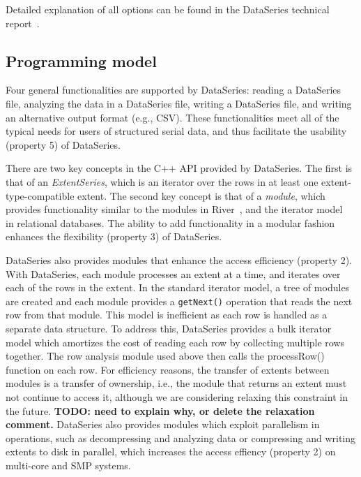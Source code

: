 \documentclass{acm_proc_article-sp}
\begin{document}
Detailed explanation of all options can be found in the DataSeries
technical report~\cite{DSTechnicalReportSnapshot}.

\subsection{Programming model}
Four general functionalities are supported by DataSeries:
reading a DataSeries file, 
analyzing the data in a DataSeries file,
writing a DataSeries file,
and writing an alternative output format (e.g., CSV).
These functionalities meet all of the typical needs for
users of structured serial data, and thus facilitate
the usability (property 5) of DataSeries.

There are two key concepts in the C++ API provided by DataSeries. The
first is that of an \textit{ExtentSeries}, which is an iterator over
the rows in at least one extent-type-compatible extent.  
The second key concept is that of a \textit{module}, which provides
functionality similar to the modules in River~\cite{river99}, and the
iterator model~\cite{graefeQueryProcessing93} in relational databases.
The ability to add functionality in a modular fashion enhances
the flexibility (property 3) of DataSeries.

DataSeries also provides modules that enhance the access efficiency
(property 2).
With DataSeries, each module processes an extent at a time, and
iterates over each of the rows in the extent.  In the standard
iterator model, a tree of modules are created and each module provides
a {\tt getNext()} operation that reads the next row from that module.
This model is inefficient as each row is handled as a separate data
structure.  To address this, DataSeries provides a 
bulk iterator model which amortizes the cost of reading each
row by collecting multiple rows together.  The row analysis module
used above then calls the processRow() function on each row.  For
efficiency reasons, the transfer of extents between modules is a
transfer of ownership, i.e., the module that returns an extent must
not continue to access it, although we are considering relaxing this
constraint in the future.  
{\bf TODO: need to explain why, or delete the relaxation comment.}
DataSeries also provides modules which exploit parallelism in operations,
such as decompressing and analyzing data or compressing and writing
extents to disk in parallel, which increases the access effiency
(property 2) on multi-core and SMP systems.
\end{document}
